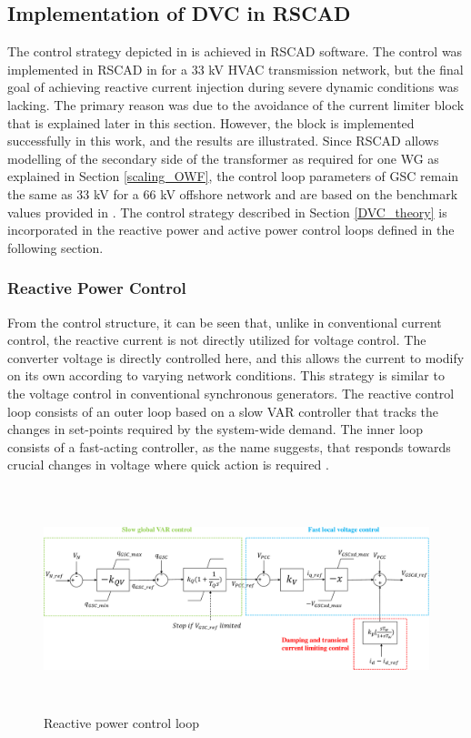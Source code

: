 \subsection{Implementation of DVC in RSCAD}\label{DVC_RSCAD}
The control strategy depicted in \cite{korai_dynamic_2019} is achieved in RSCAD software. The control was implemented in RSCAD in \cite{sethi_real-time_nodate-new} for a 33 kV \gls{HVAC} transmission network, but the final goal of achieving reactive current injection during severe dynamic conditions was lacking. The primary reason was due to the avoidance of the current limiter block that is explained later in this section. However, the block is implemented successfully in this work, and the results are illustrated. 
Since RSCAD allows modelling of the secondary side of the transformer as required for one \gls{WG} as explained in Section \ref{scaling_OWF}, the control loop parameters of \gls{GSC} remain the same as 33 kV for a 66 kV offshore network and are based on the benchmark values provided in \cite{erlich_description_2018}. The control strategy described in Section \ref{DVC_theory} is incorporated in the reactive power and active power control loops defined in the following section. 

\subsubsection{Reactive Power Control}
From the control structure, it can be seen that, unlike in conventional current control, the reactive current is not directly utilized for voltage control. The converter voltage is directly controlled here, and this allows the current to modify on its own according to varying network conditions. This strategy is similar to the voltage control in conventional synchronous generators. The reactive control loop consists of an outer loop based on a slow VAR controller that tracks the changes in set-points required by the system-wide demand. The inner loop consists of a fast-acting controller, as the name suggests, that responds towards crucial changes in voltage where quick action is required \cite{korai_dynamic_2019}.

\begin{figure}[H]
\centering
    \includegraphics[height = 6.5cm,width = \textwidth]{Diagrams/Chapter_3/Reactive_power_loop.pdf}
    \caption{Reactive power control loop \cite{korai_dynamic_2019}}
    \label{fig:Reactive_Power_Control_Loop}
\end{figure}

